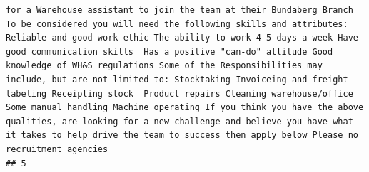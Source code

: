 \documentclass[11pt,a4paper,]{article}
\begin{document}
\begin{verbatim}
for a Warehouse assistant to join the team at their Bundaberg Branch To be considered you will need the following skills and attributes: Reliable and good work ethic The ability to work 4-5 days a week Have good communication skills  Has a positive "can-do" attitude Good knowledge of WH&S regulations Some of the Responsibilities may include, but are not limited to: Stocktaking Invoiceing and freight labeling Receipting stock  Product repairs Cleaning warehouse/office Some manual handling Machine operating If you think you have the above qualities, are looking for a new challenge and believe you have what it takes to help drive the team to success then apply below Please no recruitment agencies
## 5                                                                                                                                                                                                                                                                                                                                                                                                                                                                                                                                                                                                                                                                                                                                                                                                                                                                                                                                                                                                                                                                                                                                                                                                                                                                                                                                                                                                                                                                                                                                                                                                                                                                                                                                                                                                                                                                                                                                                                                                                                                                                                                                                                                                                                                                                                                                                                                                                                                                                                                                                                                                                                                                                                                    
\end{verbatim}
\end{document}
